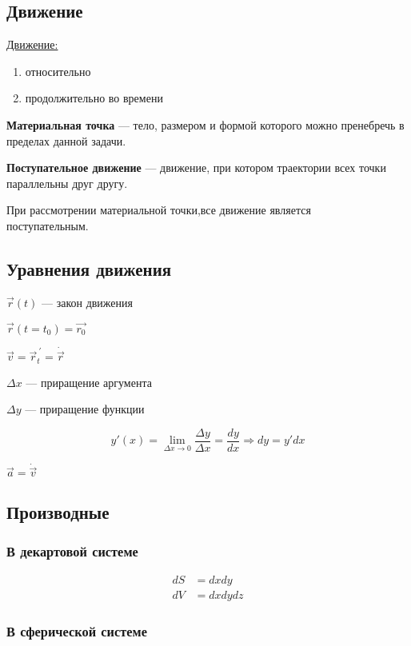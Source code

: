 \documentclass{article}
\begin{document}
\subsection{Движение}

{\Large \underline{Движение:}}
\begin{enumerate}
	\item относительно
	\item продолжительно во времени
\end{enumerate}

\textbf{Материальная точка} --- тело, размером и формой которого можно пренебречь в пределах данной задачи.

\textbf{Поступательное движение} --- движение, при котором траектории всех точки параллельны друг другу.

При рассмотрении материальной точки,все движение является \\
поступательным.

\subsection{Уравнения движения}

$\vec{r}(t)$ --- закон движения

$\vec{r}(t = t_0) = \vec{r_0}$

$\vec{v} = \vec{r}_t^{\ '} = \dot{\vec{r}}$

$\Delta x$ --- приращение аргумента

$\Delta y$ --- приращение функции

\[y'(x) = \lim_{\Delta x \to 0} \frac{\Delta y}{\Delta x} = \frac{dy}{dx} \Rightarrow dy = y'dx\]

$\vec{a} = \dot{\vec{v}}$

\subsection{Производные}

\subsubsection*{В декартовой системе}

\begin{align*}
	dS &= dx dy \\
	dV &= dx dy dz
\end{align*}

\subsubsection*{В сферической системе}
\end{document}
